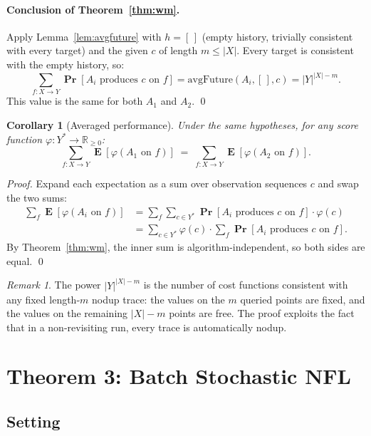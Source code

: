 \documentclass[11pt]{article}
\newtheorem{corollary}[theorem]{Corollary}
\theoremstyle{remark}
\newtheorem*{remark}{Remark}
\DeclareMathOperator{\Prob}{\mathbf{Pr}}
\DeclareMathOperator{\Exp}{\mathbf{E}}
\newcommand{\avgFuture}{\mathrm{avgFuture}}
\newcommand{\card}[1]{|#1|}
\begin{document}
\paragraph{Conclusion of Theorem~\ref{thm:wm}.}
Apply Lemma~\ref{lem:avgfuture} with $h = [\,]$ (empty history, trivially
consistent with every target) and the given $c$ of length $m \le
\card{X}$.  Every target is consistent with the empty history, so:
\[
  \sum_{f : X \to Y} \Prob[A_i \text{ produces } c \text{ on } f]
  = \avgFuture(A_i, [\,], c)
  = \card{Y}^{\card{X} - m}.
\]
This value is the same for both $A_1$ and $A_2$.
\qed

\begin{corollary}[Averaged performance]
\label{cor:avg}
  Under the same hypotheses, for any score function
  $\varphi : Y^* \to \mathbb{R}_{\ge 0}$:
  \[
    \sum_{f : X \to Y} \Exp[\varphi(A_1 \text{ on } f)]
    \;=\;
    \sum_{f : X \to Y} \Exp[\varphi(A_2 \text{ on } f)].
  \]
\end{corollary}

\begin{proof}
Expand each expectation as a sum over observation sequences $c$ and swap
the two sums:
\begin{align*}
  \sum_{f} \Exp[\varphi(A_i \text{ on } f)]
  &= \sum_{f} \sum_{c \in Y^*}
       \Prob[A_i \text{ produces } c \text{ on } f] \cdot \varphi(c)
  \\
  &= \sum_{c \in Y^*} \varphi(c) \cdot
       \sum_{f} \Prob[A_i \text{ produces } c \text{ on } f].
\end{align*}
By Theorem~\ref{thm:wm}, the inner sum is algorithm-independent, so both
sides are equal.
\qed
\end{proof}

\begin{remark}
The power $\card{Y}^{\card{X} - m}$ is the number of cost functions
consistent with any fixed length-$m$ nodup trace: the values on the $m$
queried points are fixed, and the values on the remaining $\card{X} - m$
points are free.  The proof exploits the fact that in a non-revisiting
run, every trace is automatically nodup.
\end{remark}


\section{Theorem 3: Batch Stochastic NFL}
\label{sec:batch}

\subsection{Setting}
\end{document}
